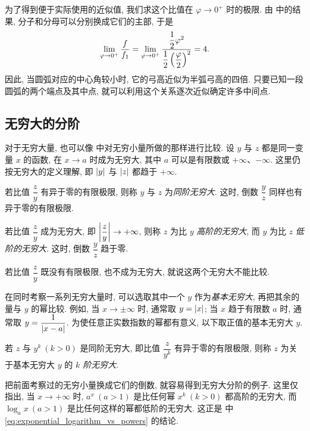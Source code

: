 为了得到便于实际使用的近似值, 我们求这个比值在 $\varphi\to0^+$ 时的极限.
由  中的结果, 分子和分母可以分别换成它们的主部,
于是
$$
\displaystyle
\lim_{\varphi\to0^+}\frac f{f_1}
=\lim_{\varphi\to0^+}
\frac{\dfrac12\varphi^2}{\dfrac12\left( \dfrac\varphi2 \right)^2}
=4.
$$
因此, 当圆弧对应的中心角较小时, 它的弓高近似为半弧弓高的四倍.
只要已知一段圆弧的两个端点及其中点, 就可以利用这个关系逐次近似确定许多中间点.

\flushbottom
\subsection{无穷大的分阶}\label{subsec:65}
对于无穷大量, 也可以像  中对无穷小量所做的那样进行比较.
设 $y$ 与 $z$ 都是同一变量 $x$ 的函数, 在 $x\to a$ 时成为无穷大,
其中 $a$ 可以是有限数或 $+\infty$、$-\infty$.
这里仍按无穷大的定义理解, 即 $\left| y \right|$ 与 $\left| z \right|$ 都趋于 $+\infty$.

\label{def:same_order_infinities}
{\kaishu 若比值 $\dfrac zy$ 有异于零的有限极限,
则称 $y$ 与 $z$ 为\emph{同阶无穷大}.
这时, 倒数 $\dfrac yz$ 同样也有异于零的有限极限.}

\label{def:higher_order_infinity}
{\kaishu 若比值 $\dfrac zy$ 成为无穷大, 即 $\left| \dfrac zy \right|\to+\infty$,
则称 $z$ 为比 $y$ \emph{高阶的无穷大},
而 $y$ 为比 $z$ \emph{低阶的无穷大}.}
这时, 倒数 $\dfrac yz$ 趋于零.

若比值 $\dfrac zy$ 既没有有限极限, 也不成为无穷大,
就说这两个无穷大不能比较.

在同时考察一系列无穷大量时, 可以选取其中一个 $y$ 作为\emph{基本无穷大}\label{def:basic_infinity},
再把其余的量与 $y$ 的幂比较.
例如, 当 $x\to\pm\infty$ 时, 通常取 $y=\left| x \right|$;
当 $x$ 趋于有限数 $a$ 时, 通常取 $y=\dfrac1{\left| x-a \right|}$.
为使任意正实数指数的幂都有意义, 以下取正值的基本无穷大 $y$.

\label{def:order_of_infinity}
{\kaishu 若 $z$ 与 $y^k\ (k>0)$ 是同阶无穷大,
即比值 $\dfrac z{y^k}$ 有异于零的有限极限,
则称 $z$ 为关于基本无穷大 $y$ 的
\emph{$k$ 阶无穷大}.}

把前面考察过的无穷小量换成它们的倒数, 就容易得到无穷大分阶的例子.
这里仅指出, 当 $x\to+\infty$ 时, $a^x\ (a>1)$ 是比任何幂 $x^k\ (k>0)$
都高阶的无穷大, 而 $\log_a x\ (a>1)$ 是比任何这样的幂都低阶的无穷大.
这正是  中 \eqref{eq:exponential_logarithm_vs_powers} 的结论.

